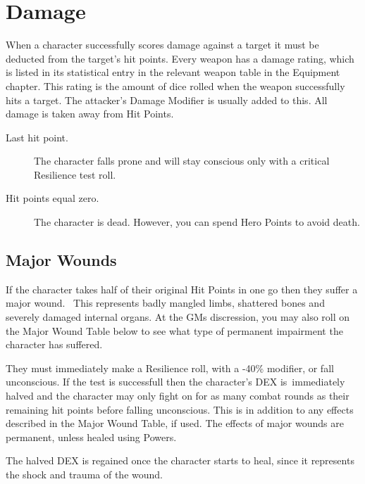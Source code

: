 \section{Damage}
When a character successfully scores damage against a target it must be deducted from the target’s hit points. Every weapon has a damage rating, which is listed in its statistical entry in the relevant weapon table in the Equipment chapter. This rating is the amount of dice rolled when the weapon successfully hits a target. The attacker’s Damage Modifier is usually added to this. All damage is taken away from Hit Points. 

\begin{description}
	\item[Last hit point.] The character falls prone and will stay conscious only with a critical Resilience test roll.
	\item[Hit points equal zero.] The character is dead. However, you can spend Hero Points to avoid death.
\end{description}


\subsection{Major Wounds}
If the character takes half of their original Hit Points in one go then they suffer a major wound.  This represents badly mangled limbs, shattered bones and severely damaged internal organs.
At the GMs discression, you may also roll on the Major Wound Table below to see what type of permanent impairment the character has suffered.

They must immediately make a Resilience roll, with a -40\% modifier, or fall unconscious. If the test is successfull then the character’s DEX is immediately halved and the character may only fight on for as many combat rounds as their remaining hit points before falling unconscious.
This is in addition to any effects described in the Major Wound Table, if used. The effects of major wounds are permanent, unless healed using Powers.

The halved DEX is regained once the character starts to heal, since it represents the shock and trauma of the wound.

